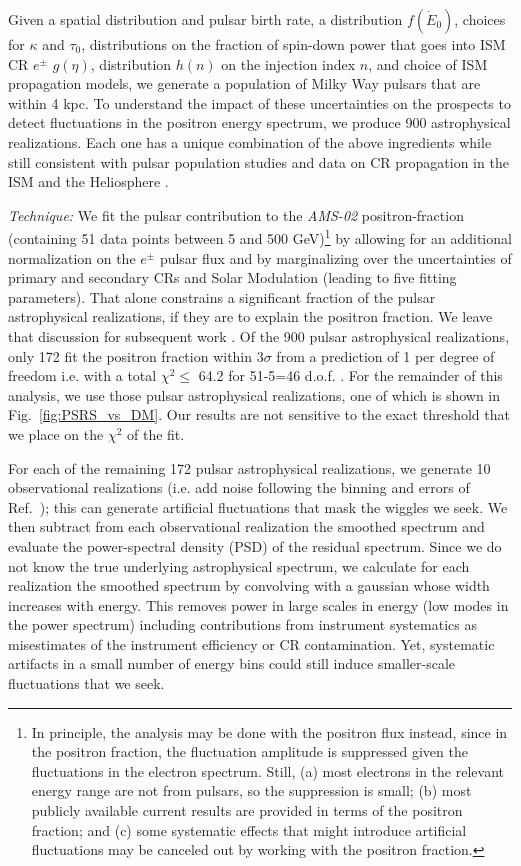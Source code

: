 \documentclass[aps,prd,twocolumn,amsmath,superscriptaddress,amssymb,showpacs,floatfix,nofootinbib]{revtex4-1}
\begin{document}
Given a spatial distribution and pulsar birth rate, a
distribution $f(\dot{E}_{0})$, choices for  $\kappa$ and $\tau_{0}$,
distributions on the fraction of spin-down power that goes into 
ISM CR $e^{\pm}$ $g(\eta)$, distribution $h(n)$ on the
injection index $n$, and choice of ISM propagation models, we
generate a population of Milky Way pulsars that are within 4
kpc. To understand the impact of these uncertainties on the
prospects to detect fluctuations in the positron energy
spectrum, we produce 900 astrophysical realizations. Each one
has a unique combination of the above ingredients while still
consistent with pulsar population studies
\cite{FaucherGiguere:2005ny} and data on CR propagation in the
ISM and the Heliosphere \cite{Trotta:2010mx}.

\textit{Technique:} We fit the pulsar contribution to the
\textit{AMS-02} positron-fraction (containing 51 data points 
between 5 and 500 GeV)\footnote{In
principle, the analysis may be done with the
positron flux instead, since in the positron fraction,
the fluctuation amplitude is suppressed given the fluctuations
in the electron spectrum.  Still, (a) most
electrons in the relevant energy range are not from pulsars,
so the suppression is small; (b) most publicly available
current results are provided in terms of the positron fraction;
and (c) some systematic effects that might introduce artificial
fluctuations may be canceled out by working with the positron
fraction.} by allowing for an
additional normalization on the  $e^{\pm}$ pulsar flux
and by marginalizing over the uncertainties of primary and
secondary CRs and Solar Modulation (leading to five fitting parameters).  
That alone constrains a significant fraction of the pulsar astrophysical 
realizations, if they are to explain the positron fraction.  We leave that
discussion for subsequent work \cite{Cholis:2018izy}. Of the 900 pulsar  
astrophysical realizations, only 172 fit the positron fraction
within $3 \sigma$ from a prediction of 1 per degree of freedom 
i.e. with a total $\chi^{2} \leq$ 64.2 for 51-5=46 d.o.f. .
For the remainder of this analysis, we use those pulsar
astrophysical realizations, one of which is shown in
Fig.~\ref{fig:PSRS_vs_DM}. Our results are not sensitive to
the exact threshold that we place on the $\chi^{2}$ of the fit. 

For each of the remaining 172 pulsar astrophysical realizations,
we generate 10 observational realizations (i.e. add noise
following the binning and errors of
Ref.~\cite{Accardo:2014lma}); this can generate artificial
fluctuations that mask the wiggles we seek.  We then subtract from
each observational realization the smoothed spectrum
and evaluate the power-spectral density (PSD) of the residual spectrum.
Since we do not know the true underlying astrophysical spectrum,
we calculate for each realization the smoothed spectrum by
convolving with a gaussian whose width increases with
energy. This removes power in large scales in energy
(low modes in the power spectrum) including contributions from
instrument systematics as misestimates of the instrument
efficiency or CR contamination. Yet, systematic artifacts in
a small number of energy bins could still induce 
smaller-scale fluctuations that we seek.
 
\end{document}
